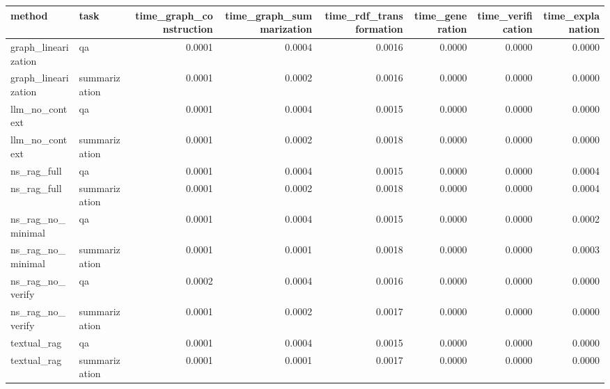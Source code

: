 \begin{tabular}{llrrrrrr}
\toprule
method & task & time_graph_construction & time_graph_summarization & time_rdf_transformation & time_generation & time_verification & time_explanation \\
\midrule
graph_linearization & qa & 0.0001 & 0.0004 & 0.0016 & 0.0000 & 0.0000 & 0.0000 \\
graph_linearization & summarization & 0.0001 & 0.0002 & 0.0016 & 0.0000 & 0.0000 & 0.0000 \\
llm_no_context & qa & 0.0001 & 0.0004 & 0.0015 & 0.0000 & 0.0000 & 0.0000 \\
llm_no_context & summarization & 0.0001 & 0.0002 & 0.0018 & 0.0000 & 0.0000 & 0.0000 \\
ns_rag_full & qa & 0.0001 & 0.0004 & 0.0015 & 0.0000 & 0.0000 & 0.0004 \\
ns_rag_full & summarization & 0.0001 & 0.0002 & 0.0018 & 0.0000 & 0.0000 & 0.0004 \\
ns_rag_no_minimal & qa & 0.0001 & 0.0004 & 0.0015 & 0.0000 & 0.0000 & 0.0002 \\
ns_rag_no_minimal & summarization & 0.0001 & 0.0001 & 0.0018 & 0.0000 & 0.0000 & 0.0003 \\
ns_rag_no_verify & qa & 0.0002 & 0.0004 & 0.0016 & 0.0000 & 0.0000 & 0.0000 \\
ns_rag_no_verify & summarization & 0.0001 & 0.0002 & 0.0017 & 0.0000 & 0.0000 & 0.0000 \\
textual_rag & qa & 0.0001 & 0.0004 & 0.0015 & 0.0000 & 0.0000 & 0.0000 \\
textual_rag & summarization & 0.0001 & 0.0001 & 0.0017 & 0.0000 & 0.0000 & 0.0000 \\
\bottomrule
\end{tabular}
